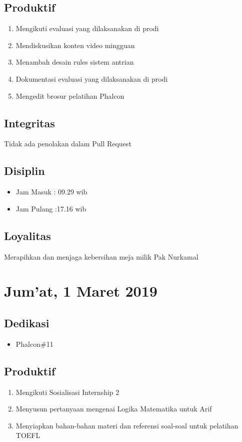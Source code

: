 \subsection{Produktif}
\begin{enumerate}
\item Mengikuti evaluasi yang dilaksanakan di prodi
\item Mendiskusikan konten video mingguan
\item Menambah desain rules sistem antrian
\item Dokumentasi evaluasi yang dilaksanakan di prodi
\item Mengedit brosur pelatihan Phalcon
\end{enumerate}
\subsection{Integritas}
Tidak ada penolakan dalam Pull Request
\subsection{Disiplin}
\begin{itemize}
\item Jam Masuk : 09.29 wib
\item Jam Pulang :17.16 wib
\end{itemize}
\subsection{Loyalitas}
Merapihkan dan menjaga kebersihan meja milik Pak Nurkamal

\section{Jum'at, 1 Maret 2019}
\subsection{Dedikasi}
\begin{itemize}
\item Phalcon\#11
\end{itemize}
\subsection{Produktif}
\begin{enumerate}
\item Mengikuti Sosialisasi Internship 2
\item Menyusun pertanyaan mengenai Logika Matematika untuk Arif
\item Menyiapkan bahan-bahan materi dan referensi soal-soal untuk pelatihan TOEFL
\end{enumerate}
